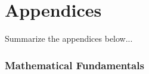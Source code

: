 
\part*{Appendices}

Summarize the appendices below...

\appendix


\toclineskip
\section{Mathematical Fundamentals}



\newpage


